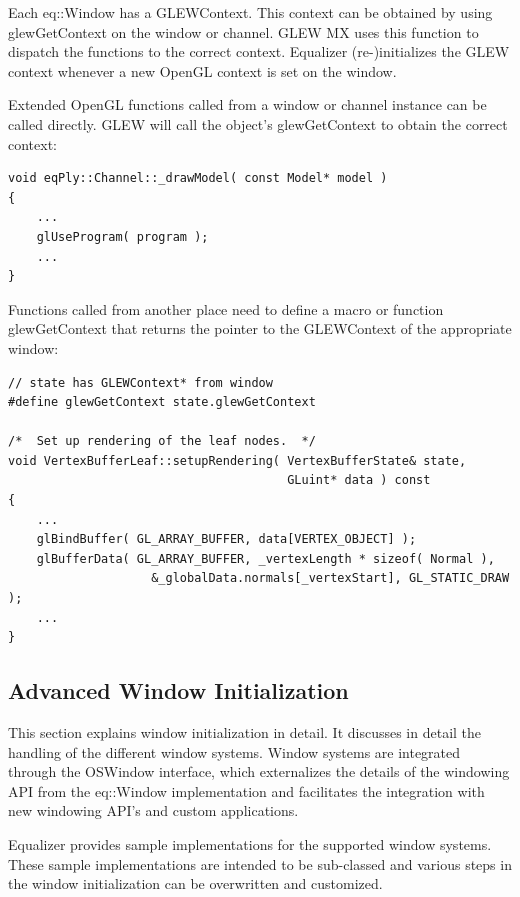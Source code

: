 \documentclass[10pt,a4]{scrartcl}
\begin{document}
Each \textsf{eq::Window} has a \textsf{GLEWContext}. This context can be
obtained by using \textsf{glewGetContext} on the window or channel. GLEW
MX uses this function to dispatch the functions to the correct
context. Equalizer (re-)initializes the GLEW context whenever a new
OpenGL context is set on the window.

Extended OpenGL functions called from a window or channel instance can
be called directly. GLEW will call the object's \textsf{glewGetContext}
to obtain the correct context:

{\footnotesize\begin{lstlisting}
void eqPly::Channel::_drawModel( const Model* model )
{
    ...
    glUseProgram( program );
    ...
}
\end{lstlisting}}

Functions called from another place need to define a macro or function
\textsf{glewGetContext} that returns the pointer to the GLEWContext of
the appropriate window:

{\footnotesize\begin{lstlisting}
// state has GLEWContext* from window
#define glewGetContext state.glewGetContext

/*  Set up rendering of the leaf nodes.  */
void VertexBufferLeaf::setupRendering( VertexBufferState& state,
                                       GLuint* data ) const
{
    ...
    glBindBuffer( GL_ARRAY_BUFFER, data[VERTEX_OBJECT] );
    glBufferData( GL_ARRAY_BUFFER, _vertexLength * sizeof( Normal ),
                    &_globalData.normals[_vertexStart], GL_STATIC_DRAW );
    ...
}
\end{lstlisting}}


\subsection{Advanced Window Initialization}

This section explains window initialization in detail. It discusses in
detail the handling of the different window systems. Window systems are
integrated through the \textsf{OSWindow} interface, which externalizes
the details of the windowing API from the \textsf{eq::Window}
implementation and facilitates the integration with new windowing API's
and custom applications.

Equalizer provides sample implementations for the supported window
systems. These sample implementations are intended to be sub-classed and
various steps in the window initialization can be overwritten and
customized.
\end{document}
